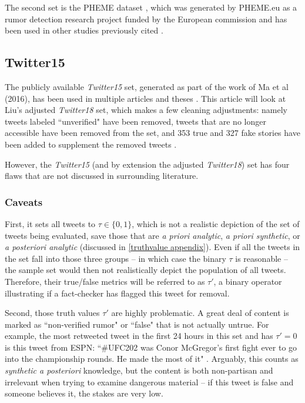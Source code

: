 \documentclass[preprint,review,12pt]{elsarticle}
\begin{document}
The second set is the PHEME dataset \cite{kochkina2018pheme}, which was generated by PHEME.eu as a rumor detection research project funded by the European commission and has been used in other studies previously cited \cite{zubiaga2016analysing}. 


\subsection{Twitter15}
 The publicly available \textit{Twitter15} set, generated as part of the work of Ma et al (2016), has been used in multiple articles and theses \citep{liu2018early,ma2017detect,ma2016detecting,khoo2020interpretable,liu2019early,huang2019deep}. This article will look at Liu's adjusted \textit{Twitter18} set, which makes a few cleaning adjustments: namely tweets labeled ``unverified" have been removed, tweets that are no longer accessible have been removed from the set, and 353 true and 327 fake stories have been added to supplement the removed tweets \citep{liu2019early}. 
 
 However, the \textit{Twitter15} (and by extension the adjusted \textit{Twitter18}) set has four flaws that are not discussed in surrounding literature. 
 
\subsubsection{Caveats}
First, it sets all tweets to $\tau \in \{0,1\}$, which is not a realistic depiction of the set of tweets being evaluated, save those that are \textit{a priori analytic}, \textit{a priori synthetic}, or \textit{a posteriori analytic} (discussed in \ref{truthvalue appendix}). Even if all the tweets in the set fall into those three groups -- in which case the binary $\tau$ is reasonable -- the sample set would then not realistically depict the population of all tweets. Therefore, their true/false metrics will be referred to as $\tau'$, a binary operator illustrating if a fact-checker has flagged this tweet for removal.

Second, those truth values $\tau'$ are highly problematic. A great deal of content is marked as ``non-verified rumor" or ``false" that is not actually untrue. For example, the most retweeted tweet in the first 24 hours in this set and has $\tau' = 0$ is this tweet from ESPN: ``\#UFC202 was Conor McGregor's first fight ever to go into the championship rounds. He made the most of it" \cite{espn2016tweet}. Arguably, this counts as \textit{synthetic a posteriori} knowledge, but the content is both non-partisan and irrelevant when trying to examine dangerous material -- if this tweet is false and someone believes it, the stakes are very low.
\end{document}
